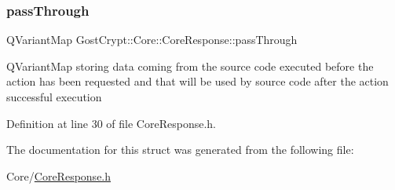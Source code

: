 \subsubsection{\texorpdfstring{pass\+Through}{passThrough}}
{\footnotesize\ttfamily Q\+Variant\+Map Gost\+Crypt\+::\+Core\+::\+Core\+Response\+::pass\+Through}

Q\+Variant\+Map storing data coming from the source code executed before the action has been requested and that will be used by source code after the action successful execution 

Definition at line 30 of file Core\+Response.\+h.



The documentation for this struct was generated from the following file\+:\begin{DoxyCompactItemize}
\item 
Core/\hyperlink{_core_response_8h}{Core\+Response.\+h}\end{DoxyCompactItemize}
